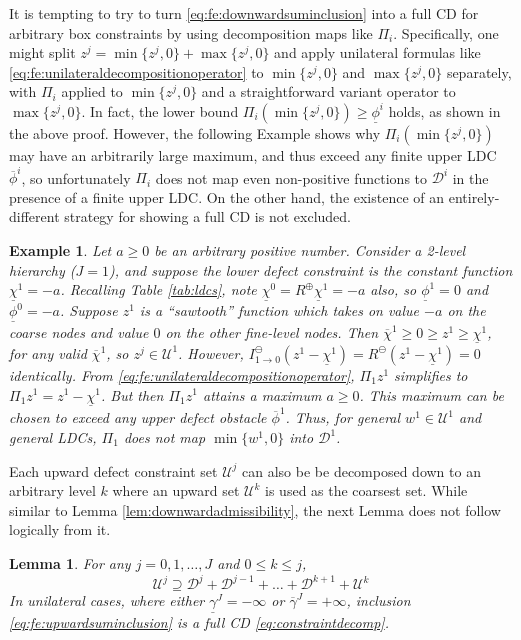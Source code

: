 \documentclass[letterpaper,final,12pt,reqno]{amsart}
\theoremstyle{cstyle}
\newtheorem{lemma}[theorem]{Lemma}
\theoremstyle{cstyle*}
\theoremstyle{dstyle}
\newtheorem{example}[theorem]{Example}
\numberwithin{equation}{section}
\numberwithin{figure}{section}
\numberwithin{table}{section}
\numberwithin{theorem}{section}
\newcommand{\maxR}{R^{\bm{\oplus}}}
\newcommand{\minR}{R^{\bm{\ominus}}}
\begin{document}
It is tempting to try to turn \eqref{eq:fe:downwardsuminclusion} into a full CD for arbitrary box constraints by using decomposition maps like $\Pi_i$.  Specifically, one might split $z^j = \min\{z^j,0\} + \max\{z^j,0\}$ and apply unilateral formulas like \eqref{eq:fe:unilateraldecompositionoperator} to $\min\{z^j,0\}$ and $\max\{z^j,0\}$ separately, with $\Pi_i$ applied to $\min\{z^j,0\}$ and a straightforward variant operator to $\max\{z^j,0\}$.  In fact, the lower bound $\Pi_i (\min\{z^j,0\}) \ge \underline{\phi}^i$ holds, as shown in the above proof.  However, the following Example shows why $\Pi_i(\min\{z^j,0\})$ may have an arbitrarily large maximum, and thus exceed any finite upper LDC $\overline{\phi}^i$, so unfortunately $\Pi_i$ does not map even non-positive functions to $\mathcal{D}^i$ in the presence of a finite upper LDC.  On the other hand, the existence of an entirely-different strategy for showing a full CD is not excluded.

\begin{example}  \label{ex:notfullcd}
Let $a\ge 0$ be an arbitrary positive number.  Consider a 2-level hierarchy ($J=1$), and suppose the lower defect constraint is the constant function $\underline{\chi}^1=-a$.  Recalling Table \ref{tab:ldcs}, note $\underline{\chi}^0=\maxR \underline{\chi}^1=-a$ also, so $\underline{\phi}^1=0$ and $\underline{\phi}^0=-a$.  Suppose $z^1$ is a ``sawtooth'' function which takes on value $-a$ on the coarse nodes and value $0$ on the other fine-level nodes.  Then $\overline{\chi}^1 \ge 0 \ge z^1\ge \underline{\chi}^1$, for any valid $\overline{\chi}^1$, so $z^j \in \mathcal{U}^1$.  However, $I_{1\to 0}^\ominus(z^1 - \underline{\chi}^1) = \minR(z^1 - \underline{\chi}^1) = 0$ identically.  From \eqref{eq:fe:unilateraldecompositionoperator}, $\Pi_1 z^1$ simplifies to $\Pi_1 z^1 = z^1 - \underline{\chi}^1$.  But then $\Pi_1 z^1$ attains a maximum $a\ge 0$.  This maximum can be chosen to exceed any upper defect obstacle $\overline{\phi}^1$.  Thus, for general $w^1 \in \mathcal{U}^1$ and general LDCs, $\Pi_1$ does not map $\min\{w^1,0\}$ into $\mathcal{D}^1$.
\end{example}

Each upward defect constraint set $\mathcal{U}^j$ can also be be decomposed down to an arbitrary level $k$ where an upward set $\mathcal{U}^k$ is used as the coarsest set.  While similar to Lemma \ref{lem:downwardadmissibility}, the next Lemma does not follow logically from it.

\begin{lemma}  \label{lem:upwardadmissibility}  For any $j=0,1,\dots,J$ and $0\le k\le j$,
\begin{equation}
\mathcal{U}^j \supseteq \mathcal{D}^j + \mathcal{D}^{j-1} + \dots + \mathcal{D}^{k+1} + \mathcal{U}^k \label{eq:fe:upwardsuminclusion}
\end{equation}
In unilateral cases, where either $\underline{\gamma}^J=-\infty$ or $\overline{\gamma}^J=+\infty$, inclusion \eqref{eq:fe:upwardsuminclusion} is a full CD \eqref{eq:constraintdecomp}. \end{lemma}
\end{document}
